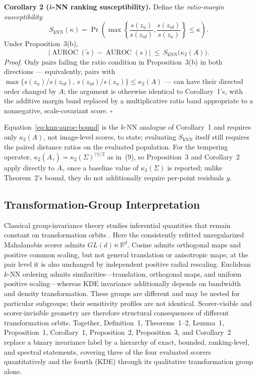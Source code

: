 \documentclass[pdflatex,sn-basic]{sn-jnl}
\theoremstyle{plain}
\theoremstyle{definition}
\theoremstyle{remark}
\begin{document}
\textbf{Corollary 2 ($k$-NN ranking susceptibility).} Define the \emph{ratio-margin susceptibility}
\begin{equation}
S_{\mathrm{kNN}}(\kappa)=\Pr\!\left(
\max\left\{\frac{s(z_u)}{s(z_{id})},\frac{s(z_{id})}{s(z_u)}\right\}
\le\kappa\right).
\end{equation}
Under Proposition~3(b),
\begin{equation}
\big|\operatorname{AUROC}(\widetilde s)-\operatorname{AUROC}(s)\big|\ \le\ S_{\mathrm{kNN}}\big(\kappa_2(A)\big).
\label{eq:knn-auroc-bound}
\end{equation}
\emph{Proof.} Only pairs failing the ratio condition in Proposition~3(b) in both directions --- equivalently, pairs with $\max\{s(z_u)/s(z_{id}),\,s(z_{id})/s(z_u)\}\le\kappa_2(A)$ --- can have their directed order changed by $A$; the argument is otherwise identical to Corollary~1's, with the additive margin band replaced by a multiplicative ratio band appropriate to a nonnegative, scale-covariant score. \hfill$\square$

Equation~\eqref{eq:knn-auroc-bound} is the $k$-NN analogue of Corollary~1 and requires only $\kappa_2(A)$, not image-level scores, to state; evaluating $S_{\mathrm{kNN}}$ itself still requires the paired distance ratios on the evaluated population. For the tempering operator, $\kappa_2(A_\gamma)=\kappa_2(\Sigma)^{|\gamma|/2}$ as in~(9), so Proposition~3 and Corollary~2 apply directly to $A_\gamma$ once a baseline value of $\kappa_2(\Sigma)$ is reported; unlike Theorem~2's bound, they do not additionally require per-point residuals $y$.

\subsection{Transformation-Group Interpretation}
Classical group-invariance theory studies inferential quantities that remain constant on transformation orbits \citep{eaton1989group}. Here the consistently refitted unregularized Mahalanobis scorer admits $GL(d)\ltimes\mathbb{R}^d$. Cosine admits orthogonal maps and positive common scaling, but not general translation or anisotropic maps; at the pair level it is also unchanged by independent positive radial rescaling. Euclidean $k$-NN ordering admits similarities---translation, orthogonal maps, and uniform positive scaling---whereas KDE invariance additionally depends on bandwidth and density transformation. These groups are different and may be nested for particular subgroups; their sensitivity profiles are not identical. Scorer-visible and scorer-invisible geometry are therefore structural consequences of different transformation orbits. Together, Definition~1, Theorems~1--2, Lemma~1, Proposition~1, Corollary~1, Proposition~2, Proposition~3, and Corollary~2 replace a binary invariance label by a hierarchy of exact, bounded, ranking-level, and spectral statements, covering three of the four evaluated scorers quantitatively and the fourth (KDE) through its qualitative transformation group alone.
\end{document}
